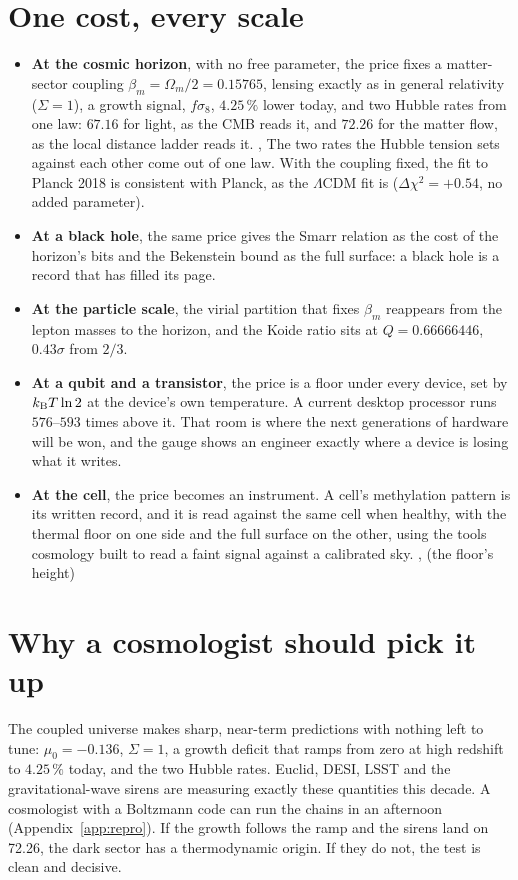 \section*{One cost, every scale}
\begin{itemize}
\item \textbf{At the cosmic horizon}, with no free parameter, the price fixes a matter-sector coupling $\beta_m=\Omega_m/2=0.15765$, lensing
      exactly as in general relativity ($\Sigma=1$), a growth signal, $f\sigma_8$, $4.25\,\%$ lower today, and two Hubble rates from one law: $67.16$ for light,
      as the CMB reads it, and $72.26$ for the matter flow, as the local distance ladder reads it. \derived, \calc{} The two rates the
      Hubble tension sets against each other come out of one law. With the coupling fixed, the fit to Planck 2018 is consistent with Planck, as the $\Lambda$CDM fit is ($\Delta\chi^2=+0.54$, no added parameter). \measured
\item \textbf{At a black hole}, the same price gives the Smarr relation as the cost of the horizon's bits and the Bekenstein bound as the full
      surface: a black hole is a record that has filled its page. \derived
\item \textbf{At the particle scale}, the virial partition that fixes $\beta_m$ reappears from the lepton masses to the horizon, and the Koide
      ratio sits at $Q=0.66666446$, $0.43\sigma$ from $2/3$. \observed
\item \textbf{At a qubit and a transistor}, the price is a floor under every device, set by $k_{\mathrm B} T\ln2$ at the device's own temperature. A current
      desktop processor runs $576$--$593$ times above it. \calc{} That room is where the next generations of hardware will be won, and the gauge shows
      an engineer exactly where a device is losing what it writes.
\item \textbf{At the cell}, the price becomes an instrument. A cell's methylation pattern is its written record, and it is read against the same
      cell when healthy, with the thermal floor on one side and the full surface on the other, using the tools cosmology built to read a faint
      signal against a calibrated sky. \derived, \measured{} (the floor's height)
\end{itemize}

\section*{Why a cosmologist should pick it up}
The coupled universe makes sharp, near-term predictions with nothing left to tune: $\mu_0=-0.136$, $\Sigma=1$, a growth deficit that ramps from
zero at high redshift to $4.25\,\%$ today, and the two Hubble rates. \prediction{} Euclid, DESI, LSST and the gravitational-wave sirens are
measuring exactly these quantities this decade. A cosmologist with a Boltzmann code can run the chains in an afternoon (Appendix~\ref{app:repro}).
If the growth follows the ramp and the sirens land on 72.26, the dark sector has a thermodynamic origin. If they do not, the test is clean and decisive.

